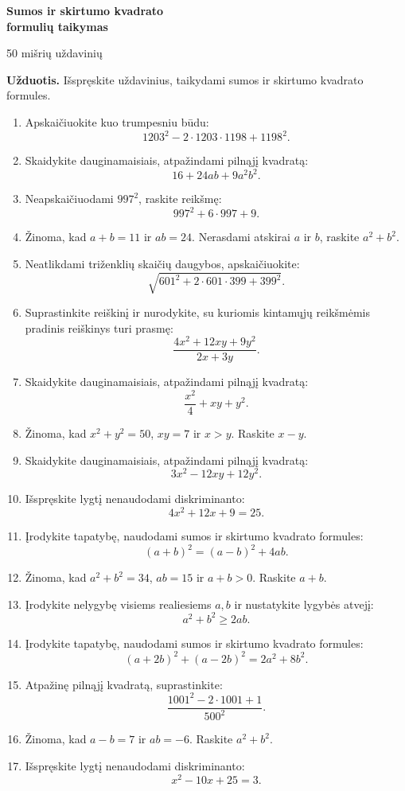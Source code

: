 \documentclass[11pt,a4paper]{article}
\begin{document}
\begin{center}
{\Large\bfseries Sumos ir skirtumo kvadrato\\[2pt]formulių taikymas}

\medskip
{\large 50 mišrių uždavinių}
\end{center}
\textbf{Užduotis.} Išspręskite uždavinius, taikydami sumos ir skirtumo
kvadrato formules.
\begin{enumerate}
\item Apskaičiuokite kuo trumpesniu būdu:\[1203^2-2\cdot1203\cdot1198+1198^2.\]
\item Skaidykite dauginamaisiais, atpažindami pilnąjį kvadratą:\[16+24ab+9a^2b^2.\]
\item Neapskaičiuodami \(997^2\), raskite reikšmę:\[997^2+6\cdot997+9.\]
\item Žinoma, kad \(a+b=11\) ir \(ab=24\). Nerasdami atskirai \(a\) ir \(b\), raskite \(a^2+b^2\).
\item Neatlikdami triženklių skaičių daugybos, apskaičiuokite:\[\sqrt{601^2+2\cdot601\cdot399+399^2}.\]
\item Suprastinkite reiškinį ir nurodykite, su kuriomis kintamųjų reikšmėmis pradinis reiškinys turi prasmę:\[\frac{4x^2+12xy+9y^2}{2x+3y}.\]
\item Skaidykite dauginamaisiais, atpažindami pilnąjį kvadratą:\[\frac{x^2}{4}+xy+y^2.\]
\item Žinoma, kad \(x^2+y^2=50\), \(xy=7\) ir \(x>y\). Raskite \(x-y\).
\item Skaidykite dauginamaisiais, atpažindami pilnąjį kvadratą:\[3x^2-12xy+12y^2.\]
\item Išspręskite lygtį nenaudodami diskriminanto:\[4x^2+12x+9=25.\]
\item Įrodykite tapatybę, naudodami sumos ir skirtumo kvadrato formules:\[(a+b)^2=(a-b)^2+4ab.\]
\item Žinoma, kad \(a^2+b^2=34\), \(ab=15\) ir \(a+b>0\). Raskite \(a+b\).
\item Įrodykite nelygybę visiems realiesiems \(a,b\) ir nustatykite lygybės atvejį:\[a^2+b^2\ge2ab.\]
\item Įrodykite tapatybę, naudodami sumos ir skirtumo kvadrato formules:\[(a+2b)^2+(a-2b)^2=2a^2+8b^2.\]
\item Atpažinę pilnąjį kvadratą, suprastinkite:\[\frac{1001^2-2\cdot1001+1}{500^2}.\]
\item Žinoma, kad \(a-b=7\) ir \(ab=-6\). Raskite \(a^2+b^2\).
\item Išspręskite lygtį nenaudodami diskriminanto:\[x^2-10x+25=3.\]

\end{enumerate}
\end{document}
